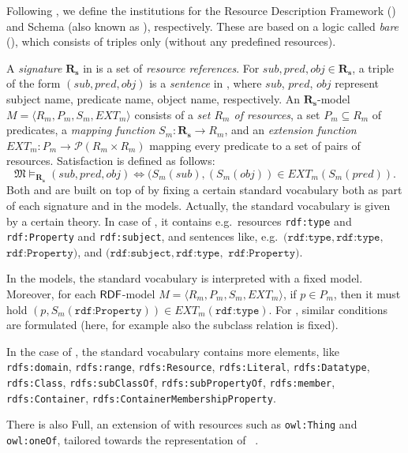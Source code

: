 \documentclass[10pt,fleqn,%
\ifpretendfinal
final%
\else
draft%
\fi,
]{scrreprt}
\begin{document}
\begin{definition}
Following \cite{Lucanu}, 
we define the institutions for the Resource Description
Framework (\RDF) and \RDF Schema (also known as \RDFS), respectively. 
These are based on a logic called \emph{bare} \RDF (\SimpleRDF), which consists
of triples only (without any predefined resources).

A \textit{signature} $\mathbf{R_s}$ in \SimpleRDF is a set of
\textit{resource references}. For $sub, pred, obj \in \mathbf{R_s}$, a
triple of the form $(sub, pred, obj)$ is a \textit{sentence} in \SimpleRDF,
where $sub$, $pred$, $obj$ represent subject name, predicate name,
object name, respectively. An $\mathbf{R_s}$-model $M =
\langle R_m, P_m, S_m, EXT_m \rangle$ consists of a \textit{set $R_m$
  of resources}, a set $P_m \subseteq R_m$ of predicates, a
\textit{mapping function} $S_m:\mathbf{R_s} \rightarrow R_m$, and an
\textit{extension function} $EXT_m: P_m \rightarrow \mathcal{P}(R_m
\times R_m)$ mapping every predicate to a set of pairs of
resources. Satisfaction is defined as follows:
%
\[\mathfrak{M} \models_{\mathbf{R_s}} (sub, pred, obj) \Leftrightarrow (S_{m}(sub),
(S_{m}(obj)) \in EXT_{m} (S_m(pred)). \]
%
Both \RDF and \RDFS are built on top of \SimpleRDF by fixing a certain
standard vocabulary both as part of each signature and in the models.
Actually, the standard vocabulary is given by a certain theory. In case
of \RDF, it contains e.g.\ resources \texttt{rdf:type} and
\texttt{rdf:Property} and \texttt{rdf:subject}, and sentences like, e.g.\
$(\texttt{rdf:type},\texttt{rdf:type},$ $ \texttt{rdf:Property})$, and $(\texttt{rdf:subject}, \texttt{rdf:type},$  $\texttt{rdf:Property})$.

In the models, the standard vocabulary is interpreted with a fixed
model.  Moreover, for each $\mathsf{RDF}$-model $M = \langle R_m, P_m, S_m,
EXT_m \rangle$, if $p\in P_m$, then it must hold
$(p,S_m(\texttt{rdf:Property}))\in EXT_m(\texttt{rdf:type})$.
For \RDFS, similar conditions are formulated (here, for example also
the subclass relation is fixed).


In the case of \RDFS, the standard vocabulary contains more elements,
like
\texttt{rdfs:domain},
\texttt{rdfs:range}, \texttt{rdfs:Resource}, \texttt{rdfs:Literal}, \texttt{rdfs:Datatype}, \texttt{rdfs:Class},
\texttt{rdfs:subClassOf}, \texttt{rdfs:subPropertyOf}, \texttt{rdfs:member}, \texttt{rdfs:Container},
\texttt{rdfs:ContainerMembershipProperty}.

There is also \OWL Full, an extension of \RDFS with resources
such as \texttt{owl:Thing} and \texttt{owl:oneOf}, tailored towards the representation of
\OWL~\cite{W3C:REC-owl2-rdf-based-semantics-20091027}.

\end{definition}
\end{document}
